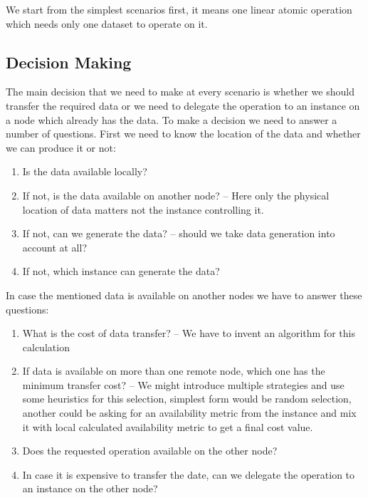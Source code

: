 We start from the simplest scenarios first, it means one linear atomic operation which needs only one dataset
to operate on it. 

\subsection{Decision Making}
The main decision that we need to make at every scenario is whether we should transfer the required data or we
need to delegate the operation to an instance on a node which already has the data. To make a decision we need to
answer a number of questions. First we need to know the location of the data and whether we can produce it or not:

\begin{enumerate}
\item Is the data available locally?
\item If not, is the data available on another node? -- Here only the physical location of data matters not the instance
controlling it.
\item If not, can we generate the data? -- should we take data generation into account at all?
\item If not, which instance can generate the data?
\end{enumerate}


In case the mentioned data is available on another nodes we have to answer these questions:
\begin{enumerate}
\item What is the cost of data transfer? -- We have to invent an algorithm for this calculation
\item If data is available on more than one remote node, which one has the minimum transfer cost? -- We might
introduce multiple strategies and use some heuristics for this selection, simplest form would be random selection,
another could be asking for an availability metric from the instance and mix it with local calculated availability 
metric to get a final cost value.
\item Does the requested operation available on the other node?
\item In case it is expensive to transfer the date, can we delegate the operation to an instance on the other node?
\end{enumerate}

